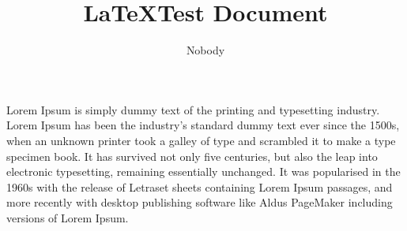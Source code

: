 \documentclass[12pt]{article}
\title{\LaTeX Test Document}
\author{Nobody}
\begin{document}
\maketitle
Lorem Ipsum is simply dummy text of the printing and typesetting industry. Lorem Ipsum has been the industry's standard dummy text ever since the 1500s, when an unknown printer took a galley of type and scrambled it to make a type specimen book. It has survived not only five centuries, but also the leap into electronic typesetting, remaining essentially unchanged. It was popularised in the 1960s with the release of Letraset sheets containing Lorem Ipsum passages, and more recently 
with desktop publishing software like Aldus PageMaker including versions of Lorem Ipsum.

\end{document}

